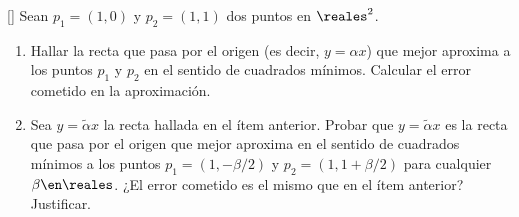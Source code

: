 \begin{enunciado}{\ejExtra}{\tiny[]}
  Sean $p_1 = (1, 0)$ y $p_2 = (1,1)$ dos puntos en $\reales^2$.
  \begin{enumerate}[label=(\alph*)]
    \item Hallar la recta que pasa por el origen (es decir, $y = \alpha x$) que mejor aproxima a los
          puntos $p_1$ y $p_2$ en el sentido de cuadrados mínimos. Calcular el error cometido en la aproximación.

    \item Sea $y = \tilde{\alpha}x$ la recta hallada en el ítem anterior. Probar que $y = \tilde{\alpha}x$ es la
          recta que pasa por el origen que mejor aproxima en el sentido de cuadrados mínimos a los puntos $p_1 = (1, -\beta/2)$
          y $p_2 = (1, 1+ \beta/2)$ para cualquier $\beta \en \reales$. ¿El error cometido es el mismo que en el ítem anterior?
          Justificar.
  \end{enumerate}

\end{enunciado}
